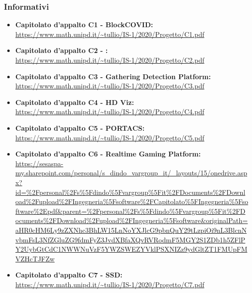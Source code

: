 \subsubsection{Informativi}
\begin{itemize}
\item \textbf {Capitolato d'appalto C1 - BlockCOVID:}\\
\url{https://www.math.unipd.it/~tullio/IS-1/2020/Progetto/C1.pdf}
\item \textbf {Capitolato d'appalto C2 - \NomeProgetto:}\\
\url{https://www.math.unipd.it/~tullio/IS-1/2020/Progetto/C2.pdf}
\item \textbf {Capitolato d'appalto C3 - Gathering Detection Platform:}\\
\url{https://www.math.unipd.it/~tullio/IS-1/2020/Progetto/C3.pdf}
\item \textbf {Capitolato d'appalto C4 - HD Viz:}\\
\url{https://www.math.unipd.it/~tullio/IS-1/2020/Progetto/C4.pdf}
\item \textbf {Capitolato d'appalto C5 - PORTACS:}\\
\url{https://www.math.unipd.it/~tullio/IS-1/2020/Progetto/C5.pdf}
\item \textbf {Capitolato d'appalto C6 - Realtime Gaming Platform:}\\
\url{https://sesaspa-my.sharepoint.com/personal/s_dindo_vargroup_it/_layouts/15/onedrive.aspx?id=%2Fpersonal%2Fs%5Fdindo%5Fvargroup%5Fit%2FDocuments%2FDownload%2Fupload%2FIngegneria%5Fsoftware%2FCapitolato%5FIngegneria%5Fsoftware%2Epdf&parent=%2Fpersonal%2Fs%5Fdindo%5Fvargroup%5Fit%2FDocuments%2FDownload%2Fupload%2FIngegneria%5Fsoftware&originalPath=aHR0cHM6Ly9zZXNhc3BhLW15LnNoYXJlcG9pbnQuY29tLzpiOi9nL3BlcnNvbmFsL3NfZGluZG9fdmFyZ3JvdXBfaXQvRVRodmF5MGY2S1ZDb1h5ZFlPY2UybGtCdC1NWWNuVzF5YWZSWEZYVklPSXNIZz9ydGltZT1FMUpFMVZHcTJFZw}
\item \textbf {Capitolato d'appalto C7 - SSD:}\\
\url{https://www.math.unipd.it/~tullio/IS-1/2020/Progetto/C7.pdf}
\end{itemize}